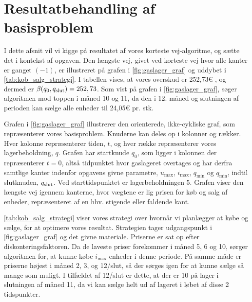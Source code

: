 \section{Resultatbehandling af basisproblem}

I dette afsnit vil vi kigge på resultatet af vores korteste vej-algoritme, og sætte det i kontekst af opgaven. Den længste vej, givet ved korteste vej hvor alle kanter er ganget $(-1)$, er illustreret på grafen i \autoref{fig:gaslager_graf} og uddybet i \autoref{tab:kob_salg_strategi}. I tabellen vises, at vores overskud er 252,73€ %
, og dermed er $\beta (q_0, q_{\textrm{slut}}) = 252,73$. Som vist på grafen i \autoref{fig:gaslager_graf}, søger algoritmen mod toppen i måned 10 og 11, da den i 12. måned og slutningen af perioden kan sælge alle enheder til 24,05€ pr. stk. 



Grafen i \autoref{fig:gaslager_graf} illustrerer den orienterede, ikke-cykliske graf, som repræsenterer vores basisproblem. Knuderne kan deles op i kolonner og rækker. Hver kolonne repræsenterer tiden, $t$, og hver række repræsenterer vores lagerbeholdning, $q$. Grafen har startknude $q_0$, som ligger i kolonnen der repræsenterer $t=0$, altså tidpunktet hvor gaslageret overtages og har derfra samtlige kanter indenfor opgavens givne parametre, $u_{\max }$, $i_{\max }$, $q_{\min }$ og $q_{\min }$, indtil slutknuden, $q_{\textrm{slut}}$. Ved starttidspunktet er lagerbeholdningen 5. Grafen viser den længste vej igennem kanterne, hvor vægtene er lig prisen for køb og salg af enheder, repræsenteret af en hhv. stigende eller faldende kant.



\autoref{tab:kob_salg_strategi} viser vores strategi over hvornår vi planlægger at købe og sælge, for at optimere vores resultat. Strategien tager udgangspunkt i \autoref{fig:gaslager_graf} og det givne materiale. Priserne er sat op efter diskonteringsfaktoren.%
Da de laveste priser forekommer i måned 5, 6 og 10, sørger algoritmen for, at kunne købe $i_{\max}$ enheder i denne periode. På samme måde er priserne højest i måned 2, 3, og 12/slut, så der sørges igen for at kunne sælge så mange som muligt. I tilfældet af 12/slut er dette, at der er 10 på lager i slutningen af måned 11, da vi kan sælge helt ud af lageret i løbet af disse 2 tidspunkter.

